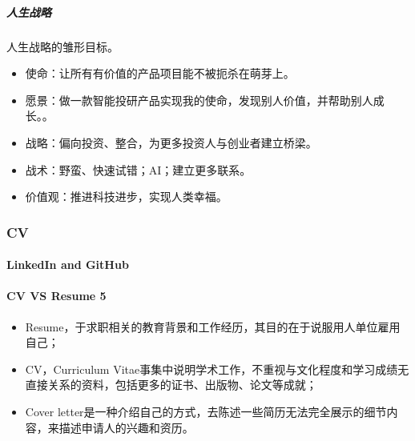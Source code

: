 \documentclass[letterpaper,11pt,english]{sphinxmanual}
\begin{document}
\subparagraph{人生战略}
\label{\detokenize{chapter_interview/choose:id9}}
人生战略的雏形目标。%
\begin{footnote}[760]\sphinxAtStartFootnote
{}
%
\end{footnote}
\begin{itemize}
\item {} 
使命：让所有有价值的产品项目能不被扼杀在萌芽上。

\item {} 
愿景：做一款智能投研产品实现我的使命，发现别人价值，并帮助别人成长。。

\item {} 
战略：偏向投资、整合，为更多投资人与创业者建立桥梁。

\item {} 
战术：野蛮、快速试错；AI；建立更多联系。

\item {} 
价值观：推进科技进步，实现人类幸福。

\end{itemize}


\subsubsection{CV}
\label{\detokenize{chapter_interview/CV:cv}}\label{\detokenize{chapter_interview/CV::doc}}
\begin{center}\end{center} 


\paragraph{LinkedIn and GitHub}
\label{\detokenize{chapter_interview/CV:linkedin-and-github}}


\paragraph{CV VS Resume 5\sphinxfootnotemark[761]}
\label{\detokenize{chapter_interview/CV:cv-vs-resume-5}}%
\begin{footnotetext}[761]\sphinxAtStartFootnote
{}
%
\end{footnotetext}\ignorespaces \begin{itemize}
\item {} 
Resume，于求职相关的教育背景和工作经历，其目的在于说服用人单位雇用自己；

\item {} 
CV，Curriculum
Vitae事集中说明学术工作，不重视与文化程度和学习成绩无直接关系的资料，包括更多的证书、出版物、论文等成就；

\item {} 
Cover
letter是一种介绍自己的方式，去陈述一些简历无法完全展示的细节内容，来描述申请人的兴趣和资历。

\end{itemize}
\end{document}
